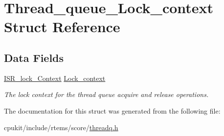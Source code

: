 \hypertarget{structThread__queue__Lock__context}{}\section{Thread\+\_\+queue\+\_\+\+Lock\+\_\+context Struct Reference}
\label{structThread__queue__Lock__context}
\subsection*{Data Fields}
\begin{DoxyCompactItemize}
\item 
\mbox{\label{structThread__queue__Lock__context_a86f8630f4363c72176676fe7412b6b25}} 
\mbox{\hyperlink{structISR__lock__Context}{I\+S\+R\+\_\+lock\+\_\+\+Context}} \mbox{\hyperlink{structThread__queue__Lock__context_a86f8630f4363c72176676fe7412b6b25}{Lock\+\_\+context}}
\begin{DoxyCompactList}\small\item\em The lock context for the thread queue acquire and release operations. \end{DoxyCompactList}\end{DoxyCompactItemize}


The documentation for this struct was generated from the following file\+:\begin{DoxyCompactItemize}
\item 
cpukit/include/rtems/score/\mbox{\hyperlink{threadq_8h}{threadq.\+h}}\end{DoxyCompactItemize}
